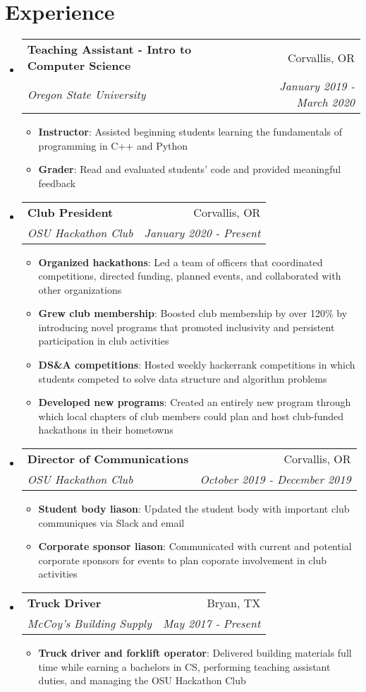 \documentclass[letterpaper,11pt]{article}
\makeatletter
\newcommand{\resumeItem}[2]{
  \item\small{
    \textbf{#1}{: #2 \vspace{-2pt}}
  }
}
\newcommand{\resumeSubheading}[4]{
  \vspace{-1pt}\item
    \begin{tabular*}{0.97\textwidth}[t]{l@{\extracolsep{\fill}}r}
      \textbf{#1} & #2 \\
      \textit{\small#3} & \textit{\small #4} \\
    \end{tabular*}\vspace{-5pt}
}
\newcommand{\resumeSubHeadingListStart}{\begin{itemize}[leftmargin=*]}
\newcommand{\resumeSubHeadingListEnd}{\end{itemize}}
\newcommand{\resumeItemListStart}{\begin{itemize}}
\newcommand{\resumeItemListEnd}{\end{itemize}\vspace{-5pt}}
\makeatother
\begin{document}
\section{Experience}
  \resumeSubHeadingListStart
	\resumeSubheading{Teaching Assistant - Intro to Computer Science}{Corvallis, OR}
	                 {Oregon State University}{January 2019 - March 2020}
      \resumeItemListStart
        \resumeItem{Instructor}{Assisted beginning students learning the fundamentals of programming in C++ and Python}
       	\resumeItem{Grader}{Read and evaluated students' code and provided meaningful feedback}
      \resumeItemListEnd
    \resumeSubheading{Club President}{Corvallis, OR}
                     {OSU Hackathon Club}{January 2020 - Present}
       \resumeItemListStart
         \resumeItem{Organized hackathons}{Led a team of officers that coordinated competitions, directed funding, planned events, and collaborated with other organizations}
         \resumeItem{Grew club membership}{Boosted club membership by over 120\% by introducing novel programs that promoted inclusivity and persistent participation in club activities}
         \resumeItem{DS\&A competitions}{Hosted weekly hackerrank competitions in which students competed to solve data structure and algorithm problems}
         \resumeItem{Developed new programs}{Created an entirely new program through which local chapters of club members could plan and host club-funded hackathons in their hometowns}
       \resumeItemListEnd
     \resumeSubheading{Director of Communications}{Corvallis, OR}
                      {OSU Hackathon Club}{October 2019 - December 2019}
        \resumeItemListStart
          \resumeItem{Student body liason}{Updated the student body with important club communiques via Slack and email}
          \resumeItem{Corporate sponsor liason}{Communicated with current and potential corporate sponsors for events to plan coporate involvement in club activities}
        \resumeItemListEnd
         \resumeSubheading{Truck Driver}{Bryan, TX}
                          {McCoy's Building Supply}{May 2017 - Present}
      \resumeItemListStart
      		\resumeItem{Truck driver and forklift operator}{Delivered building materials full time while earning a bachelors in CS, performing teaching assistant duties, and managing the OSU Hackathon Club}
      \resumeItemListEnd
  \resumeSubHeadingListEnd
\hfill

\end{document}
